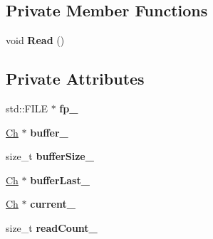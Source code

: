 \subsection*{Private Member Functions}
\begin{DoxyCompactItemize}
\item 
void {\bfseries Read} ()\hypertarget{class_file_read_stream_a9213039798b7a07275a451f96a42361a}{}\label{class_file_read_stream_a9213039798b7a07275a451f96a42361a}

\end{DoxyCompactItemize}
\subsection*{Private Attributes}
\begin{DoxyCompactItemize}
\item 
std\+::\+F\+I\+LE $\ast$ {\bfseries fp\+\_\+}\hypertarget{class_file_read_stream_a47dc4f7f100bcc02a02e619f9b494a62}{}\label{class_file_read_stream_a47dc4f7f100bcc02a02e619f9b494a62}

\item 
\hyperlink{class_file_read_stream_ae1f83d9ca3c76d1d151af0b6c427f046}{Ch} $\ast$ {\bfseries buffer\+\_\+}\hypertarget{class_file_read_stream_a1b5563bcaa959d95f9bc3511a73ebbad}{}\label{class_file_read_stream_a1b5563bcaa959d95f9bc3511a73ebbad}

\item 
size\+\_\+t {\bfseries buffer\+Size\+\_\+}\hypertarget{class_file_read_stream_af65abe97e76c94c7f0f6419f94e9105f}{}\label{class_file_read_stream_af65abe97e76c94c7f0f6419f94e9105f}

\item 
\hyperlink{class_file_read_stream_ae1f83d9ca3c76d1d151af0b6c427f046}{Ch} $\ast$ {\bfseries buffer\+Last\+\_\+}\hypertarget{class_file_read_stream_a5affa127604e77646d7acc94432c7e59}{}\label{class_file_read_stream_a5affa127604e77646d7acc94432c7e59}

\item 
\hyperlink{class_file_read_stream_ae1f83d9ca3c76d1d151af0b6c427f046}{Ch} $\ast$ {\bfseries current\+\_\+}\hypertarget{class_file_read_stream_a0c7b4824d8742960eba2ac81c1e6b662}{}\label{class_file_read_stream_a0c7b4824d8742960eba2ac81c1e6b662}

\item 
size\+\_\+t {\bfseries read\+Count\+\_\+}\hypertarget{class_file_read_stream_a1b1a7cadb599e83b1f781c0b16d4ed50}{}\label{class_file_read_stream_a1b1a7cadb599e83b1f781c0b16d4ed50}


\end{DoxyCompactItemize}

